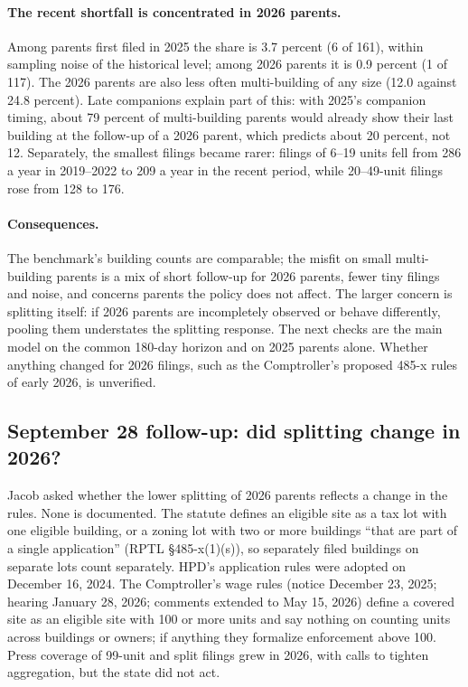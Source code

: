 \paragraph{The recent shortfall is concentrated in 2026 parents.} Among
parents first filed in 2025 the share is 3.7 percent (6 of 161), within
sampling noise of the historical level; among 2026 parents it is 0.9 percent (1
of 117). The 2026 parents are also less often multi-building of any size (12.0
against 24.8 percent). Late companions explain part of this: with 2025's
companion timing, about 79 percent of multi-building parents would already
show their last building at the follow-up of a 2026 parent, which predicts
about 20 percent, not 12. Separately, the smallest filings became rarer:
filings of 6--19 units fell from 286 a year in 2019--2022 to 209 a year in the
recent period, while 20--49-unit filings rose from 128 to 176.

\paragraph{Consequences.} The benchmark's building counts are comparable; the
misfit on small multi-building parents is a mix of short follow-up for 2026
parents, fewer tiny filings and noise, and concerns parents the policy does
not affect. The larger concern is splitting itself: if 2026 parents are
incompletely observed or behave differently, pooling them understates the
splitting response. The next checks are the main model on the common 180-day
horizon and on 2025 parents alone. Whether anything changed for 2026 filings,
such as the Comptroller's proposed 485-x rules of early 2026, is unverified.

\subsection*{September 28 follow-up: did splitting change in 2026?}

Jacob asked whether the lower splitting of 2026 parents reflects a change in
the rules. None is documented. The statute defines an eligible site as a tax
lot with one eligible building, or a zoning lot with two or more buildings
``that are part of a single application'' (RPTL \S 485-x(1)(s)), so separately
filed buildings on separate lots count separately. HPD's application rules
were adopted on December 16, 2024. The Comptroller's wage rules (notice
December 23, 2025; hearing January 28, 2026; comments extended to May 15, 2026)
define a covered site as an eligible site with 100 or more units and say
nothing on counting units across buildings or owners; if anything they
formalize enforcement above 100. Press coverage of 99-unit and split filings
grew in 2026, with calls to tighten aggregation, but the state did not act.

